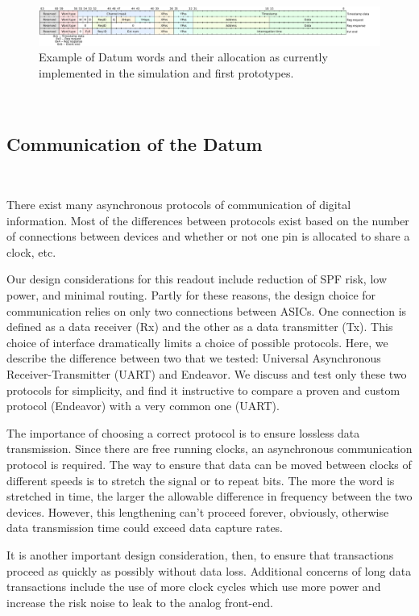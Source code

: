 \begin{figure}[]
\centering
\includegraphics[width=\textwidth]{images/qpix_word_format.pdf}
\caption{Example of Datum words and their allocation as currently implemented in the simulation and first prototypes.}
\end{figure}~\label{fig:datum}

\subsection{Communication of the Datum}~\label{sec:comms}

There exist many asynchronous protocols of communication of digital information.
Most of the differences between protocols exist based on the number of connections between devices and whether or not one pin is allocated to share a clock, etc.

Our design considerations for this readout include reduction of SPF risk, low power, and minimal routing.
Partly for these reasons, the design choice for communication relies on only two connections between ASICs.
One connection is defined as a data receiver (Rx) and the other as a data transmitter (Tx).
This choice of interface dramatically limits a choice of possible protocols.
Here, we describe the difference between two that we tested: Universal Asynchronous Receiver-Transmitter (UART) and Endeavor.
We discuss and test only these two protocols for simplicity, and find it instructive to compare a proven and custom protocol (Endeavor) with a very common one (UART).

The importance of choosing a correct protocol is to ensure lossless data transmission.
Since there are free running clocks, an asynchronous communication protocol is required.
The way to ensure that data can be moved between clocks of different speeds is to stretch the signal or to repeat bits.
The more the word is stretched in time, the larger the allowable difference in frequency between the two devices.
However, this lengthening can't proceed forever, obviously, otherwise data transmission time could exceed data capture rates.

It is another important design consideration, then, to ensure that transactions proceed as quickly as possibly without data loss.
Additional concerns of long data transactions include the use of more clock cycles which use more power and increase the risk noise to leak to the analog front-end.

